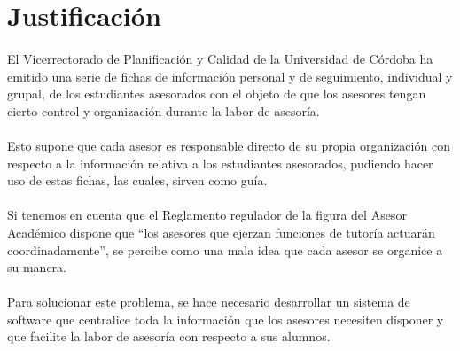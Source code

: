 \section{Justificación}

\paragraph{}El Vicerrectorado de Planificación y Calidad de la Universidad de
Córdoba ha emitido una serie de fichas de información personal y de seguimiento,
individual y grupal, de los estudiantes asesorados con el objeto de que los
asesores tengan cierto control y organización durante la labor de asesoría.

\paragraph{}Esto supone que cada asesor es responsable directo de su propia
organización con respecto a la información relativa a los estudiantes
asesorados, pudiendo hacer uso de estas fichas, las cuales, sirven como guía.

\paragraph{}Si tenemos en cuenta que el Reglamento regulador de la figura del
Asesor Académico dispone que ``los asesores que ejerzan funciones de tutoría
actuarán coordinadamente'', se percibe como una mala idea que cada asesor se
organice a su manera.

\paragraph{}Para solucionar este problema, se hace necesario desarrollar un
sistema de software que centralice toda la información que los asesores
necesiten disponer y que facilite la labor de asesoría con respecto a sus
alumnos.
